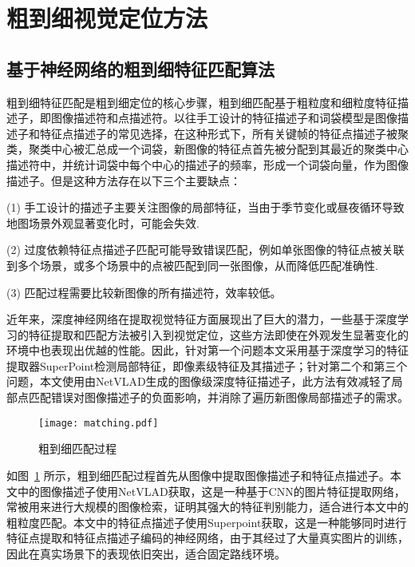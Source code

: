 \section{粗到细视觉定位方法}
\label{sec:c2f_loc}

\subsection{基于神经网络的粗到细特征匹配算法}

粗到细特征匹配是粗到细定位的核心步骤，粗到细匹配基于粗粒度和细粒度特征描述子，即图像描述符和点描述符。以往手工设计的特征描述子\cite{lowe2004distinctive, rublee2011orb}和词袋模型是图像描述子和特征点描述子的常见选择，在这种形式下，所有关键帧的特征点描述子被聚类，聚类中心被汇总成一个词袋，新图像的特征点首先被分配到其最近的聚类中心描述符中，并统计词袋中每个中心的描述子的频率，形成一个词袋向量，作为图像描述子。但是这种方法存在以下三个主要缺点：

(1) 手工设计的描述子主要关注图像的局部特征，当由于季节变化或昼夜循环导致地图场景外观显著变化时，可能会失效.

(2) 过度依赖特征点描述子匹配可能导致错误匹配，例如单张图像的特征点被关联到多个场景，或多个场景中的点被匹配到同一张图像，从而降低匹配准确性.

(3) 匹配过程需要比较新图像的所有描述符，效率较低。

近年来，深度神经网络在提取视觉特征方面展现出了巨大的潜力，一些基于深度学习的特征提取和匹配方法\cite{detone2018superpoint, arandjelovic2016netvlad, sarlin2020superglue}被引入到视觉定位，这些方法即使在外观发生显著变化的环境中也表现出优越的性能。因此，针对第一个问题本文采用基于深度学习的特征提取器SuperPoint\cite{detone2018superpoint}检测局部特征，即像素级特征及其描述子；针对第二个和第三个问题，本文使用由NetVLAD\cite{arandjelovic2016netvlad}生成的图像级深度特征描述子，此方法有效减轻了局部点匹配错误对图像描述子的负面影响，并消除了遍历新图像局部描述子的需求。

\begin{figure}
  \centering
  \texttt{[image: matching.pdf]}
  \caption{粗到细匹配过程}
  \label{fig:matching}
\end{figure}

如图~\ref{fig:matching} 所示，粗到细匹配过程首先从图像中提取图像描述子和特征点描述子。本文中的图像描述子使用NetVLAD\cite{arandjelovic2016netvlad}获取，这是一种基于CNN的图片特征提取网络，常被用来进行大规模的图像检索，证明其强大的特征判别能力，适合进行本文中的粗粒度匹配。本文中的特征点描述子使用Superpoint\cite{detone2018superpoint}获取，这是一种能够同时进行特征点提取和特征点描述子编码的神经网络，由于其经过了大量真实图片的训练，因此在真实场景下的表现依旧突出，适合固定路线环境。


